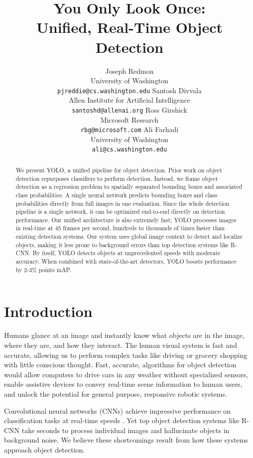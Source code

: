\documentclass{article} %
\title{You Only Look Once: \\
Unified, Real-Time Object Detection}
\author{Joseph Redmon\\
University of Washington\\
\texttt{pjreddie@cs.washington.edu}
\And
Santosh Divvala\\
Allen Institute for Artificial Intelligence\\
\texttt{santoshd@allenai.org}
\And
Ross Girshick\\
Microsoft Research\\
\texttt{rbg@microsoft.com}
\And
Ali Farhadi\\
University of Washington\\
\texttt{ali@cs.washington.edu}
}
\begin{document}
\maketitle

\vspace{-.2cm}
\begin{abstract}
We present YOLO, a unified pipeline for object detection. Prior work on object detection repurposes classifiers to perform detection. Instead, we frame object detection as a regression problem to spatially separated bounding boxes and associated class probabilities. A single neural network predicts bounding boxes and class probabilities directly from full images in one evaluation. Since the whole detection pipeline is a single network, it can be optimized end-to-end directly on detection performance. Our unified architecture is also extremely fast; YOLO processes images in real-time at 45 frames per second, hundreds to thousands of times faster than existing detection systems. Our system uses global image context to detect and localize objects, making it less prone to background errors than top detection systems like R-CNN. By itself, YOLO detects objects at unprecedented speeds with moderate accuracy. When combined with state-of-the-art detectors, YOLO boosts performance by 2-3\% points mAP.
\end{abstract}

\section{Introduction}

Humans glance at an image and instantly know what objects are in the image, where they are, and how they interact. The human visual system is fast and accurate, allowing us to perform complex tasks like driving or grocery shopping with little conscious thought. Fast, accurate, algorithms for object detection would allow computers to drive cars in any weather without specialized sensors, enable assistive devices to convey real-time scene information to human users, and unlock the potential for general purpose, responsive robotic systems.

Convolutional neural networks (CNNs) achieve impressive performance on classification tasks at real-time speeds \cite{DBLP:journals/corr/HeZR015}. Yet top object detection systems like R-CNN take seconds to process individual images and hallucinate objects in background noise. We believe these shortcomings result from how these systems approach object detection.
\end{document}

